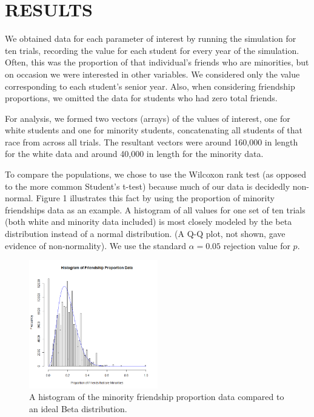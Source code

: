 
\section{RESULTS}
\label{sec:results}

We obtained data for each parameter of interest by running the simulation for
ten trials, recording the value for each student for every year of the
simulation. Often, this was the proportion of that individual's friends who
are minorities, but on occasion we were interested in other variables. We
considered only the value corresponding to each student's senior year. Also,
when considering friendship proportions, we omitted the data for students who
had zero total friends. 

For analysis, we formed two vectors (arrays) of the values of interest, one
for white students and one for minority students, concatenating all students
of that race from across all trials. The resultant vectors were around 160,000
in length for the white data and around 40,000 in length for the minority
data.

To compare the populations, we chose to use the Wilcoxon rank test (as opposed
to the more common Student's t-test) because much of our data is decidedly
non-normal. Figure 1 illustrates this fact by using the proportion of minority
friendships data as an example. A histogram of all values for one set of ten
trials (both white and minority data included) is most closely modeled by the
beta distribution instead of a normal distribution. (A Q-Q plot, not shown,
gave evidence of non-normality). We use the standard $\alpha=0.05$ rejection
value for $p$.

\begin{figure}[ht]
  \centering
    \includegraphics[width=0.5\textwidth]{histogramProportionData.png}
      \caption{A histogram of the minority friendship proportion data compared
to an ideal Beta distribution.}
\end{figure}

